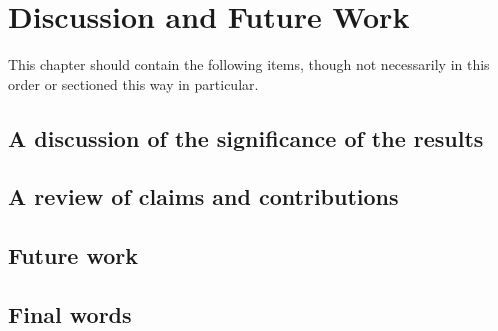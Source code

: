 %
%

\chapter{Discussion and Future Work}\label{ch:conclusion}

This chapter should contain the following items, though not
necessarily in this order or sectioned this way in particular.

\section{A discussion of the significance of the results}

\section{A review of claims and contributions}


\section{Future work}

\section{Final words}
